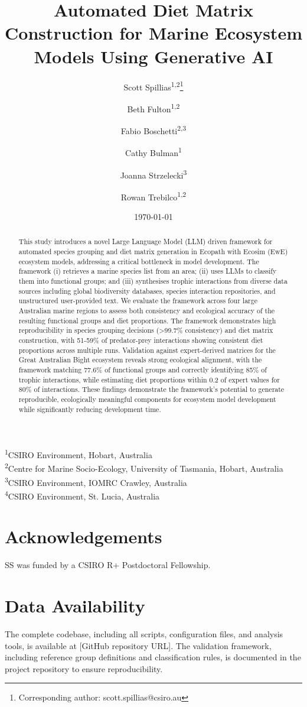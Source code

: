 \documentclass[12pt,a4paper]{article}
\title{Automated Diet Matrix Construction for Marine Ecosystem Models Using Generative AI}
\author{Scott Spillias\textsuperscript{1,2}\thanks{Corresponding author: scott.spillias@csiro.au} \and
Beth Fulton\textsuperscript{1,2} \and
Fabio Boschetti\textsuperscript{2,3} \and
Cathy Bulman\textsuperscript{1} \and
Joanna Strzelecki\textsuperscript{3} \and
Rowan Trebilco\textsuperscript{1,2}}
\date{\today}  %
\newcommand{\affiliations}{
\noindent\textsuperscript{1}CSIRO Environment, Hobart, Australia\\
\textsuperscript{2}Centre for Marine Socio-Ecology, University of Tasmania, Hobart, Australia\\
\textsuperscript{3}CSIRO Environment, IOMRC Crawley, Australia\\
\textsuperscript{4}CSIRO Environment, St. Lucia, Australia
}
\begin{document}
\maketitle
\affiliations

\begin{abstract}
This study introduces a novel Large Language Model (LLM) driven framework for automated species grouping and diet matrix generation in Ecopath with Ecosim (EwE) ecosystem models, addressing a critical bottleneck in model development. The framework (i) retrieves a marine species list from an area; (ii) uses LLMs to classify them into functional groups; and (iii) synthesises trophic interactions from diverse data sources including global biodiversity databases, species interaction repositories, and unstructured user-provided text. We evaluate the framework across four large Australian marine regions to assess both consistency and ecological accuracy of the resulting functional groups and diet proportions. The framework demonstrates high reproducibility in species grouping decisions (>99.7\% consistency) and diet matrix construction, with 51-59\% of predator-prey interactions showing consistent diet proportions across multiple runs. Validation against expert-derived matrices for the Great Australian Bight ecosystem reveals strong ecological alignment, with the framework matching 77.6\% of functional groups and correctly identifying 85\% of trophic interactions, while estimating diet proportions within 0.2 of expert values for 80\% of interactions. These findings demonstrate the framework's potential to generate reproducible, ecologically meaningful components for ecosystem model development while significantly reducing development time.
\end{abstract}






\section*{Acknowledgements}
SS was funded by a CSIRO R+ Postdoctoral Fellowship.

\section*{Data Availability}
The complete codebase, including all scripts, configuration files, and analysis tools, is available at [GitHub repository URL]. The validation framework, including reference group definitions and classification rules, is documented in the project repository to ensure reproducibility.
\end{document}
